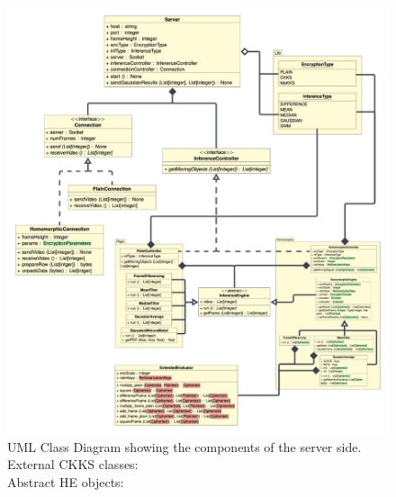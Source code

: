 \begin{figure}[htp]
    \centering
    \includegraphics[scale=0.236]{figures/serverClasses}
    \captionsetup{justification=centering}
    \caption[Client UML Class Diagram]{UML Class Diagram showing the components of the server side.\medskip\\External CKKS classes: \hl{\quad\quad\quad\quad}\smallskip\\Abstract HE objects: \hl{\quad\quad\quad\quad}}
    \label{fig:serverUML}
\end{figure}
        
